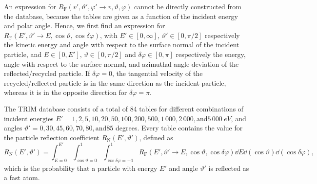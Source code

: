 An expression for $R_{\mathrm{F}}(v',\vartheta',\varphi' \rightarrow v,\vartheta,\varphi)$ cannot be directly constructed from the database, because the tables are given as a function of the incident energy and polar angle. Hence, we first find an expression for $R_{\mathrm{F}}(E',\vartheta' \rightarrow E,\cos \vartheta,\cos \delta \varphi)$, with $E' \in [0,\infty]$, $\vartheta' \in [0,\pi/2]$ respectively the kinetic energy and angle with respect to the surface normal of the incident particle, and $E \in [0,E']$, $\vartheta \in [0,\pi/2]$ and $\delta \varphi \in [0, \pi]$ respectively the energy, angle with respect to the surface normal, and azimuthal angle deviation of the reflected/recycled particle. If $\delta \varphi = 0$, the tangential velocity of the recycled/reflected particle is in the same direction as the incident particle, whereas it is in the opposite direction for $\delta \varphi = \pi$.

The TRIM database consists of a total of 84 tables for different combinations of incident energies $E' = 1, 2, 5, 10, 20, 50, 100, 200, 500, 1\,000, 2\,000, \mathrm{and} 5\,000~eV$, and angles $\vartheta' = 0, 30, 45, 60, 70, 80, \mathrm{and} 85$ degrees. Every table contains the value for the particle reflection coefficient $R_{\mathrm{N}}(E',\vartheta')$, defined as
\begin{equation}
R_{\mathrm{N}}(E',\vartheta') = \int_{E = 0}^{E'} \int_{\cos \vartheta = 0}^{1} \int_{\cos \delta \varphi = -1}^{1} R_{\mathrm{F}}(E',\vartheta' \rightarrow E,\cos \vartheta,\cos \delta \varphi) \dd E \dd (\cos \vartheta) \dd (\cos \delta \varphi), \label{eq:RN}
\end{equation}
which is the probability that a particle with energy $E'$ and angle $\vartheta'$ is reflected as a fast atom.

